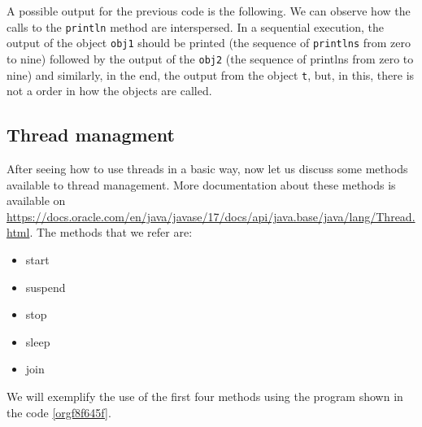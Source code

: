\documentclass{latex/classes/thesis}
\begin{document}
A possible output for the previous code is the following. We can observe how
the calls to the \texttt{println} method are interspersed. In a sequential execution,
the output of the object \texttt{obj1} should be printed (the sequence of \texttt{printlns}
from zero to nine) followed by the output of the \texttt{obj2} (the sequence of
printlns from zero to nine) and similarly, in the end, the output from the
object \texttt{t}, but, in this, there is not a order in how the objects are
called.

\subsection{Thread managment}
\label{sec:org28d9727}

After seeing how to use threads in a basic way, now let us discuss some
methods available to thread management. More documentation about these
methods is available on
\url{https://docs.oracle.com/en/java/javase/17/docs/api/java.base/java/lang/Thread.html}.
The methods that we refer are:

\begin{itemize}
\item start
\item suspend
\item stop
\item sleep
\item join
\end{itemize}

We will exemplify the use of the first four methods using the program shown
in the code \ref{orgf8f645f}.
\end{document}
